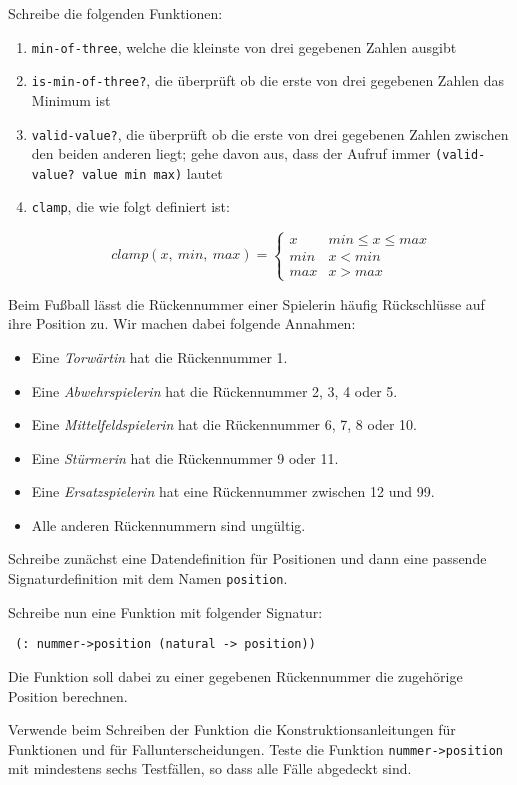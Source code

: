 \begin{aufgabe}
  Schreibe die folgenden Funktionen:
  \begin{enumerate}
  \item \lstinline{min-of-three}, welche die kleinste von drei
    gegebenen Zahlen ausgibt
  \item \lstinline{is-min-of-three?}, die überprüft ob die erste
    von drei gegebenen Zahlen das Minimum ist
  \item \lstinline{valid-value?}, die überprüft ob die erste von
    drei gegebenen Zahlen zwischen den beiden anderen liegt; gehe
    davon aus, dass der Aufruf immer \lstinline{(valid-value? value min max)}
    lautet 
  \item \lstinline{clamp}, die wie folgt definiert ist:
    
    \[\mathit{clamp}(x,\ \mathit{min},\ \mathit{max})=
    \begin{cases} 
      x & \mathit{min} \leq x \leq \mathit{max}\\ 
      \mathit{min} & x < \mathit{min} \\ 
      \mathit{max} & x > \mathit{max}
    \end{cases}
    \]
    
  \end{enumerate}
\end{aufgabe}

\begin{aufgabe}
  Beim Fußball lässt die Rückennummer einer Spielerin
  häufig Rückschlüsse auf ihre Position zu. Wir machen dabei folgende
  Annahmen:
  \begin{itemize}
  \item Eine \emph{Torwärtin} hat die Rückennummer 1.
  \item Eine \emph{Abwehrspielerin} hat die Rückennummer 2, 3, 4 oder 5.
  \item Eine \emph{Mittelfeldspielerin} hat die Rückennummer 6, 7, 8 oder 10.
  \item Eine \emph{Stürmerin} hat die Rückennummer 9 oder 11.
  \item Eine \emph{Ersatzspielerin} hat eine Rückennummer zwischen 12 und 99.
  \item Alle anderen Rückennummern sind ungültig.
  \end{itemize}
  Schreibe zunächst eine Datendefinition für Positionen und dann eine
  passende Signaturdefinition mit dem Namen \lstinline{position}.
  
  Schreibe nun eine Funktion mit folgender Signatur:
\begin{lstlisting}
 (: nummer->position (natural -> position))
\end{lstlisting}
  Die Funktion soll dabei zu einer gegebenen Rückennummer die
  zugehörige Position berechnen.

  Verwende beim Schreiben der Funktion die
  Konstruktionsanleitungen für Funktionen und für
  Fallunterscheidungen.  Teste die Funktion
  \lstinline{nummer->position} mit mindestens sechs Testfällen, so dass
  alle Fälle abgedeckt sind.
\end{aufgabe}


